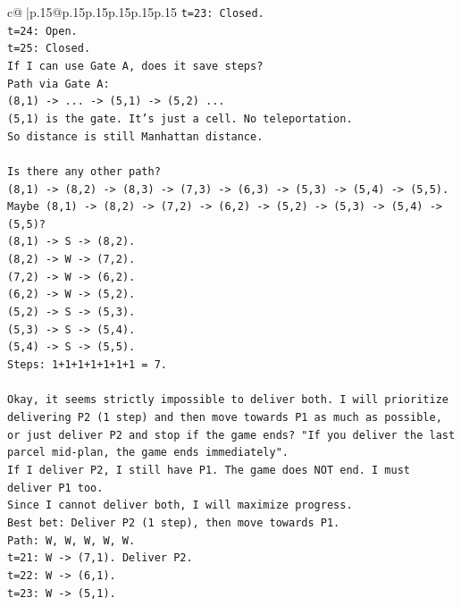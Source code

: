 \documentclass{article}
\begin{document}
{\begin{supertabular}{c@{$\;$}|p{.15\linewidth}@{}p{.15\linewidth}p{.15\linewidth}p{.15\linewidth}p{.15\linewidth}p{.15\linewidth}}
{{{\texttt{t=23: Closed.} \\
\texttt{t=24: Open.} \\
\texttt{t=25: Closed.} \\
\texttt{If I can use Gate A, does it save steps?} \\
\texttt{Path via Gate A:} \\
\texttt{(8,1) {-}> ... {-}> (5,1) {-}> (5,2) ...} \\
\texttt{(5,1) is the gate. It's just a cell. No teleportation.} \\
\texttt{So distance is still Manhattan distance.} \\
\\ 
\texttt{Is there any other path?} \\
\texttt{(8,1) {-}> (8,2) {-}> (8,3) {-}> (7,3) {-}> (6,3) {-}> (5,3) {-}> (5,4) {-}> (5,5).} \\
\texttt{Maybe (8,1) {-}> (8,2) {-}> (7,2) {-}> (6,2) {-}> (5,2) {-}> (5,3) {-}> (5,4) {-}> (5,5)?} \\
\texttt{(8,1) {-}> S {-}> (8,2).} \\
\texttt{(8,2) {-}> W {-}> (7,2).} \\
\texttt{(7,2) {-}> W {-}> (6,2).} \\
\texttt{(6,2) {-}> W {-}> (5,2).} \\
\texttt{(5,2) {-}> S {-}> (5,3).} \\
\texttt{(5,3) {-}> S {-}> (5,4).} \\
\texttt{(5,4) {-}> S {-}> (5,5).} \\
\texttt{Steps: 1+1+1+1+1+1+1 = 7.} \\
\\ 
\texttt{Okay, it seems strictly impossible to deliver both. I will prioritize delivering P2 (1 step) and then move towards P1 as much as possible, or just deliver P2 and stop if the game ends? "If you deliver the last parcel mid{-}plan, the game ends immediately".} \\
\texttt{If I deliver P2, I still have P1. The game does NOT end. I must deliver P1 too.} \\
\texttt{Since I cannot deliver both, I will maximize progress.} \\
\texttt{Best bet: Deliver P2 (1 step), then move towards P1.} \\
\texttt{Path: W, W, W, W, W.} \\
\texttt{t=21: W {-}> (7,1). Deliver P2.} \\
\texttt{t=22: W {-}> (6,1).} \\
\texttt{t=23: W {-}> (5,1).} \\
}}}
\end{supertabular}}
\end{document}
